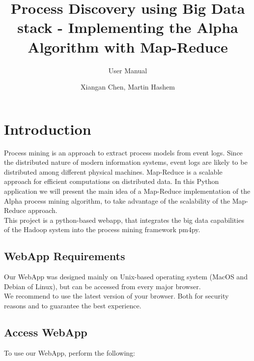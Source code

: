 \documentclass[runningheads]{llncs}
\begin{document}
%
\title{Process Discovery using Big Data stack - Implementing the Alpha Algorithm with Map-Reduce}
\subtitle{User Manual}
%
%

\author{Xiangan Chen, Martin Hashem}

%
\maketitle              %
%
%
%	
%
\section{Introduction}
Process mining is an approach to extract process models from event logs. Since the distributed nature of modern information systems, event logs are likely to be distributed among different physical machines. Map-Reduce is a scalable approach for efficient computations on distributed data. In this Python application we will present the main idea of a Map-Reduce implementation of the Alpha process mining algorithm, to take advantage of the scalability of the Map-Reduce approach.\\

\noindent
This project is a python-based webapp, that integrates the big data capabilities of the Hadoop system into the process mining framework pm4py.
\subsection{WebApp Requirements}
Our WebApp was designed mainly on Unix-based operating system (MacOS and Debian of Linux), but can be accessed from every major browser. \\

\noindent
We recommend to use the latest version of your browser. Both for security reasons and to guarantee the best experience.
\subsection{Access WebApp}
To use our WebApp, perform the following:\\
\end{document}
